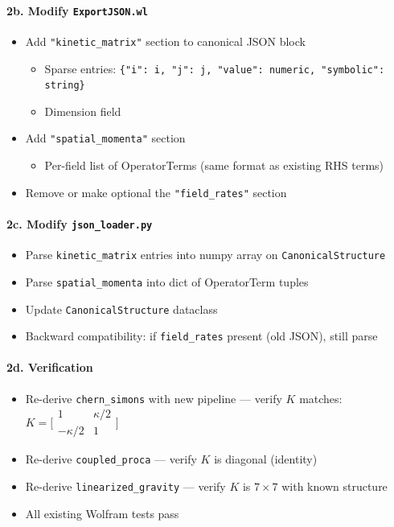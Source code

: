 \paragraph{2b. Modify \texttt{ExportJSON.wl}}
\label{par:modify-export}

\begin{itemize}
  \item[$\square$] Add \texttt{"kinetic\_matrix"} section to canonical JSON block
  \begin{itemize}
    \item Sparse entries: \texttt{\{"i": i, "j": j, "value": numeric, "symbolic": string\}}
    \item Dimension field
  \end{itemize}
  \item[$\square$] Add \texttt{"spatial\_momenta"} section
  \begin{itemize}
    \item Per-field list of OperatorTerms (same format as existing RHS terms)
  \end{itemize}
  \item[$\square$] Remove or make optional the \texttt{"field\_rates"} section
\end{itemize}

\paragraph{2c. Modify \texttt{json\_loader.py}}
\label{par:modify-loader}

\begin{itemize}
  \item[$\square$] Parse \texttt{kinetic\_matrix} entries into numpy array on \texttt{CanonicalStructure}
  \item[$\square$] Parse \texttt{spatial\_momenta} into dict of OperatorTerm tuples
  \item[$\square$] Update \texttt{CanonicalStructure} dataclass
  \item[$\square$] Backward compatibility: if \texttt{field\_rates} present (old JSON), still parse
\end{itemize}

\paragraph{2d. Verification}
\label{par:phase2-verify}

\begin{itemize}
  \item[$\square$] Re-derive \texttt{chern\_simons} with new pipeline --- verify $K$ matches:
    $K = \bigl[\begin{smallmatrix} 1 & \kappa/2 \\ -\kappa/2 & 1 \end{smallmatrix}\bigr]$
  \item[$\square$] Re-derive \texttt{coupled\_proca} --- verify $K$ is diagonal (identity)
  \item[$\square$] Re-derive \texttt{linearized\_gravity} --- verify $K$ is $7\times 7$ with known structure
  \item[$\square$] All existing Wolfram tests pass
\end{itemize}

